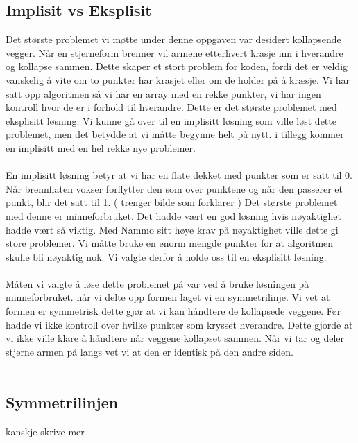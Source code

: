 \subsection{Implisit vs Eksplisit}
Det største problemet vi møtte under denne oppgaven var desidert kollapsende vegger. Når en stjerneform brenner vil armene etterhvert krasje inn i hverandre og kollapse sammen. Dette skaper et stort problem for koden, fordi det er veldig vanskelig å vite om to punkter har krasjet eller om de holder på å kræsje. Vi har satt opp algoritmen så vi har en array med en rekke punkter, vi har ingen kontroll hvor de er i forhold til hverandre. Dette er det største problemet med eksplisitt løsning. Vi kunne gå over til en implisitt løsning som ville løst dette problemet, men det betydde at vi måtte begynne helt på nytt. i tillegg kommer en implisitt med en hel rekke nye problemer. \\ \\
En implisitt løsning betyr at vi har en flate dekket med punkter som er satt til 0. Når brennflaten vokser forflytter den som over punktene og når den passerer et punkt, blir det satt til 1. ( trenger bilde som forklarer ) Det største problemet med denne er minneforbruket. Det hadde vært en god løsning hvis nøyaktighet hadde vært så viktig. Med Nammo sitt høye krav på nøyaktighet ville dette gi store problemer. Vi måtte bruke en enorm mengde punkter for at algoritmen skulle bli nøyaktig nok. Vi valgte derfor å holde oss til en eksplisitt løsning.\\ \\
Måten vi valgte å løse dette problemet på var ved å bruke løsningen på minneforbruket. når vi delte opp formen laget vi en symmetrilinje. Vi vet at formen er symmetrisk dette gjør at vi kan håndtere de kollapsede veggene. Før hadde vi ikke kontroll over hvilke punkter som krysset hverandre. Dette gjorde at vi ikke ville klare å håndtere når veggene kollapset sammen. Når vi tar og deler stjerne armen på langs vet vi at den er identisk på den andre siden.\\ \\












\subsection{Symmetrilinjen}
kanskje skrive mer \\ \\

